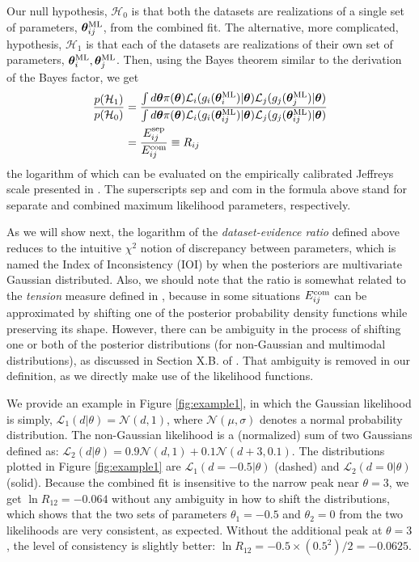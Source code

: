 \documentclass[amsmath, prd, reprint, aps]{revtex4-1}
\newcommand{\tv}{\bm{\theta}}
\newcommand{\tML}{\tv^{\rm ML}}
\begin{document}
Our null hypothesis, $\mathcal{H}_0$ is that both the datasets are realizations of a single set of parameters, $\tML_{ij}$, from the combined fit. The alternative, more complicated, hypothesis, $\mathcal{H}_1$ is that each of the datasets are realizations of their own set of parameters, $\tML_i, \tML_j$. Then, using the Bayes theorem similar to the derivation of the Bayes factor, we get
\begin{align}
	\frac{p(\mathcal{H}_1)}{p(\mathcal{H}_0)} &= \frac{\int d\tv \pi(\tv) \mathcal{L}_i(g_i(\tML_i)|\tv) \mathcal{L}_j(g_j(\tML_j)|\tv)}{\int d\tv \pi(\tv) \mathcal{L}_i(g_i(\tML_{ij})|\tv) \mathcal{L}_j(g_j(\tML_{ij})|\tv)} \label{eq:DER} \\
    &= \frac{E_{ij}^{\rm sep}}{{E_{ij}^{\rm com}}} \equiv R_{ij}
\end{align}
the logarithm of which can be evaluated on the empirically calibrated Jeffreys scale presented in \cite{Trotta:2008qt}. The superscripts sep and com in the formula above stand for separate and combined maximum likelihood parameters, respectively.

As we will show next, the logarithm of the \textit{dataset-evidence ratio} defined above reduces to the intuitive $\chi^2$ notion of discrepancy between parameters, which is named the Index of Inconsistency (IOI) by \cite{Lin:2017ikq} when the posteriors are multivariate Gaussian distributed. Also, we should note that the ratio is somewhat related to the \textit{tension} measure defined in \cite{Verde:2013wza}, because in some situations $E_{ij}^{\rm com}$ can be approximated by shifting one of the posterior probability density functions while preserving its shape. However, there can be ambiguity in the process of shifting one or both of the posterior distributions (for non-Gaussian and multimodal distributions), as discussed in Section X.B. of \cite{Lin:2017ikq}. That ambiguity is removed in our definition, as we directly make use of the likelihood functions. 

We provide an example in Figure \ref{fig:example1}, in which the Gaussian likelihood is simply, $\mathcal{L}_1(d|\theta) = \mathcal{N}(d, 1)$, where $\mathcal{N}(\mu, \sigma)$ denotes a normal probability distribution. The non-Gaussian likelihood is a (normalized) sum of two Gaussians defined as: $\mathcal{L}_2(d|\theta) = 0.9 \mathcal{N}(d, 1) + 0.1 \mathcal{N}(d+3, 0.1)$. The distributions plotted in Figure \ref{fig:example1} are $\mathcal{L}_1(d=-0.5|\theta)$ (dashed) and $\mathcal{L}_2(d=0|\theta)$ (solid). Because the combined fit is insensitive to the narrow peak near $\theta=3$, we get $\ln R_{12}=-0.064$ without any ambiguity in how to shift the distributions, which shows that the two sets of parameters $\theta_1=-0.5$ and $\theta_2=0$ from the two likelihoods are very consistent, as expected. Without the additional peak at $\theta=3$, the level of consistency is slightly better: $\ln R_{12} = -0.5\times(0.5^2)/2 = -0.0625$.
\end{document}
